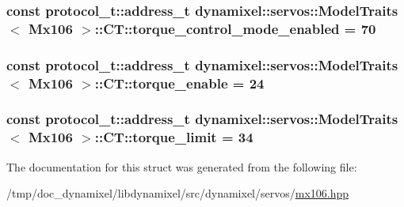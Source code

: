 \subsubsection[{torque\+\_\+control\+\_\+mode\+\_\+enabled}]{\setlength{\rightskip}{0pt plus 5cm}const {\bf protocol\+\_\+t\+::address\+\_\+t} {\bf dynamixel\+::servos\+::\+Model\+Traits}$<$ {\bf Mx106} $>$\+::C\+T\+::torque\+\_\+control\+\_\+mode\+\_\+enabled = 70\hspace{0.3cm}{\ttfamily [static]}}\label{structdynamixel_1_1servos_1_1_model_traits_3_01_mx106_01_4_1_1_c_t_a15618c19842b4c285b5ca23348ba0fb2}
\hypertarget{structdynamixel_1_1servos_1_1_model_traits_3_01_mx106_01_4_1_1_c_t_a91582754caa26c05515062cb6336cb6f}{}
\subsubsection[{torque\+\_\+enable}]{\setlength{\rightskip}{0pt plus 5cm}const {\bf protocol\+\_\+t\+::address\+\_\+t} {\bf dynamixel\+::servos\+::\+Model\+Traits}$<$ {\bf Mx106} $>$\+::C\+T\+::torque\+\_\+enable = 24\hspace{0.3cm}{\ttfamily [static]}}\label{structdynamixel_1_1servos_1_1_model_traits_3_01_mx106_01_4_1_1_c_t_a91582754caa26c05515062cb6336cb6f}
\hypertarget{structdynamixel_1_1servos_1_1_model_traits_3_01_mx106_01_4_1_1_c_t_abb6d4c8767d196077837d53bdb93da3e}{}
\subsubsection[{torque\+\_\+limit}]{\setlength{\rightskip}{0pt plus 5cm}const {\bf protocol\+\_\+t\+::address\+\_\+t} {\bf dynamixel\+::servos\+::\+Model\+Traits}$<$ {\bf Mx106} $>$\+::C\+T\+::torque\+\_\+limit = 34\hspace{0.3cm}{\ttfamily [static]}}\label{structdynamixel_1_1servos_1_1_model_traits_3_01_mx106_01_4_1_1_c_t_abb6d4c8767d196077837d53bdb93da3e}


The documentation for this struct was generated from the following file\+:\begin{DoxyCompactItemize}
\item 
/tmp/doc\+\_\+dynamixel/libdynamixel/src/dynamixel/servos/\hyperlink{mx106_8hpp}{mx106.\+hpp}\end{DoxyCompactItemize}
